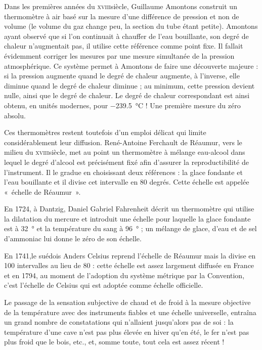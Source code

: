 	Dans les premières années du \textsc{xviii}\ieme siècle, Guillaume Amontons construit un thermomètre à air basé sur la mesure d'une différence de pression et non de volume (le volume du gaz change peu, la section du tube étant petite). Amontons ayant observé que si l'on continuait à chauffer de l'eau bouillante, son degré de chaleur n'augmentait pas, il utilise cette référence comme point fixe. Il fallait évidemment corriger les mesures par une mesure simultanée de la pression atmosphérique. Ce système permet à Amontons de faire une découverte majeure : si la pression augmente quand le degré de chaleur augmente, à l'inverse, elle diminue quand le degré de chaleur diminue ; au minimum, cette pression devient nulle, ainsi que le degré de chaleur. Le degré de chaleur correspondant est ainsi obtenu, en unités modernes, pour \SI{-239,5}{\degreeCelsius} ! Une première mesure du zéro absolu.
	
	Ces thermomètres restent toutefois d'un emploi délicat qui limite considérablement leur diffusion.	René-Antoine Ferchault de Réaumur, vers le milieu du \textsc{xviii}\ieme siècle, met au point un thermomètre à mélange eau-alcool dans lequel le degré d'alcool est précisément fixé afin d'assurer la reproductibilité de l'instrument. Il le gradue en choisissant deux références : la glace fondante et l'eau bouillante et il divise cet intervalle en 80 degrés. Cette échelle est appelée «~échelle de Réaumur~». 
	
	En 1724, à Dantzig, Daniel Gabriel Fahrenheit décrit un thermomètre qui utilise la dilatation du mercure et introduit une échelle pour laquelle la glace fondante est à \SI{32}{\degree} et la température du sang à \SI{96}{\degree} ; un mélange de glace, d'eau et de sel d'ammoniac lui donne le zéro de son échelle.
	
	En 1741,le suédois Anders Celsius reprend l'échelle de Réaumur mais la divise en 100 intervalles au lieu de 80 : cette échelle est assez largement diffusée en France et en 1794, au moment de l'adoption du système métrique par la Convention, c'est l'échelle de Celsius qui est adoptée comme échelle officielle.

	Le passage de la sensation subjective de chaud et de froid à la mesure objective de la température avec des instruments fiables et une échelle universelle, entraîna un grand nombre de constatations qui n'allaient jusqu'alors pas de soi : la température d'une cave n'est pas plus élevée en hiver qu'en été, le fer n'est pas plus froid que le bois, etc., et, somme toute, tout cela est assez récent !

\atendofhistorysection
